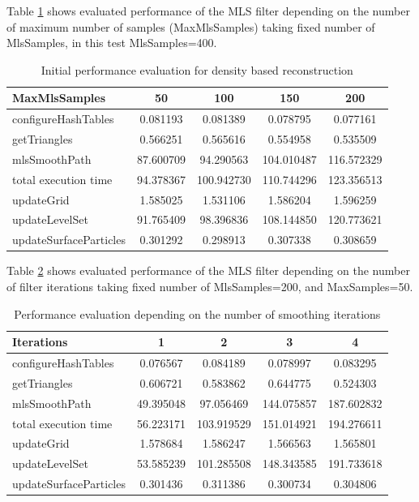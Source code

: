 Table \ref{tab:mls_mms_perf} shows evaluated performance of the MLS filter depending on the number of maximum number of samples  (MaxMlsSamples) taking fixed number of MlsSamples, in this test MlsSamples=400.
\begin{table}[H]
	\begin{center}
		\scriptsize
		\begin{tabular}{|l|c|c|c|c|}
			\hline
			MaxMlsSamples & 50 & 100 & 150 & 200 \\
			\hline
			configureHashTables     	& 0.081193	&	0.081389	& 0.078795		& 0.077161\\
			getTriangles    			& 0.566251	&	0.565616	& 0.554958		& 0.535509\\
			mlsSmoothPath   			& 87.600709	&	94.290563	& 104.010487	& 116.572329\\
			total execution time    	& 94.378367	&	100.942730	& 110.744296	& 123.356513\\
			updateGrid      			& 1.585025	&	1.531106	& 1.586204		& 1.596259\\
			updateLevelSet  			& 91.765409	&	98.396836	& 108.144850	& 120.773621\\
			updateSurfaceParticles  	& 0.301292	&	0.298913	& 0.307338		& 0.308659\\
			\hline
		\end{tabular}
	\end{center}
	\caption{Initial performance evaluation for density based reconstruction}
	\label{tab:mls_mms_perf}
\end{table}
Table \ref{tab:mls_iter_perf} shows evaluated performance of the MLS filter depending on the number of filter iterations taking fixed number of MlsSamples=200, and MaxSamples=50.
\begin{table}[H]
	\begin{center}
		\scriptsize
		\begin{tabular}{|l|c|c|c|c|}
			\hline
			Iterations & 1 & 2 & 3 & 4 \\
			\hline
			configureHashTables     	& 0.076567	&	0.084189	& 0.078997		& 0.083295\\
			getTriangles    			& 0.606721	&	0.583862	& 0.644775		& 0.524303\\
			mlsSmoothPath   			& 49.395048	&	97.056469	& 144.075857	& 187.602832\\
			total execution time    	& 56.223171	&	103.919529	& 151.014921	& 194.276611\\
			updateGrid      			& 1.578684	&	1.586247	& 1.566563		& 1.565801\\
			updateLevelSet  			& 53.585239	&	101.285508	& 148.343585	& 191.733618\\
			updateSurfaceParticles  	& 0.301436	&	0.311386	& 0.300734		& 0.304806\\
			\hline
		\end{tabular}
	\end{center}
	\caption{Performance evaluation depending on the number of smoothing iterations}
	\label{tab:mls_iter_perf}
\end{table}


